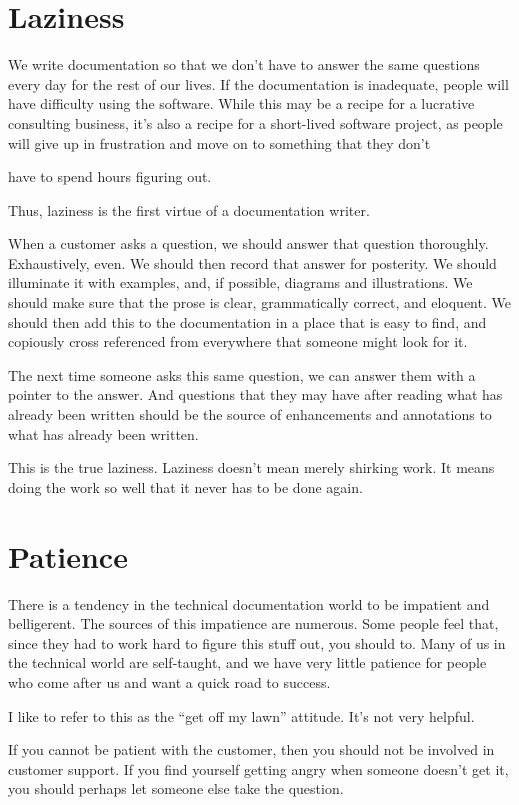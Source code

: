 \section*{Laziness}

We write documentation so that we don't have to answer the same questions every day for the rest of our lives. If the documentation is inadequate, people will have difficulty using the software. While this may be a recipe for a lucrative consulting business, it's also a recipe for a short-lived software project, as people will give up in frustration and move on to something that they don't 

have to spend hours figuring out.

Thus, laziness is the first virtue of a documentation writer.

When a customer asks a question, we should answer that question thoroughly. Exhaustively, even. We should then record that answer for posterity. We should illuminate it with examples, and, if possible, diagrams and illustrations. We should make sure that the prose is clear,
grammatically correct, and eloquent. We should then add this to the documentation in a place that is easy to find, and copiously cross referenced from everywhere that someone might look for it.

The next time someone asks this same question, we can answer them with a pointer to the answer. And questions that they may have after reading what has already been written should be the source of enhancements and annotations to what has already been written.

This is the true laziness. Laziness doesn't mean merely shirking work. It means doing the work so well that it never has to be done again.

\section*{Patience}
There is a tendency in the technical documentation world to be impatient and belligerent. The sources of this impatience are numerous. Some people feel that, since they had to work hard to figure this stuff out, you should to. Many of us in the technical world are self-taught, and we have very little patience for people who come after us and want a quick road to success.

I like to refer to this as the “get off my lawn” attitude. It’s not very helpful.

If you cannot be patient with the customer, then you should not be involved in customer support. If you find yourself getting angry when someone doesn’t get it, you should perhaps let someone else take the question.

